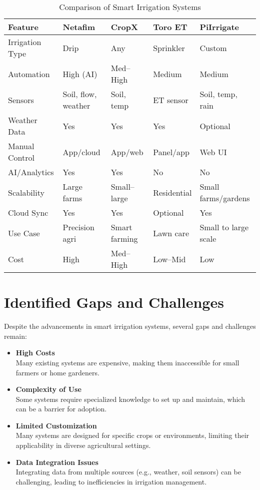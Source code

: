 \begin{table}[ht]
\centering
\begin{tabular}{|p{3.2cm}|p{3.2cm}|p{3.2cm}|p{3.2cm}|p{3.2cm}|}
\hline
\textbf{Feature} & \textbf{Netafim} & \textbf{CropX} & \textbf{Toro ET} & \textbf{PiIrrigate} \\
\hline
Irrigation Type & Drip & Any & Sprinkler & Custom \\
\hline
Automation & High (AI) & Med–High & Medium & Medium \\
\hline
Sensors & Soil, flow, weather & Soil, temp & ET sensor & Soil, temp, rain \\
\hline
Weather Data & Yes & Yes & Yes & Optional \\
\hline
Manual Control & App/cloud & App/web & Panel/app & Web UI \\
\hline
AI/Analytics & Yes & Yes & No & No \\
\hline
Scalability & Large farms & Small–large & Residential & Small farms/gardens \\
\hline
Cloud Sync & Yes & Yes & Optional & Yes \\
\hline
Use Case & Precision agri & Smart farming & Lawn care & Small to large scale\\
\hline
Cost & High & Med–High & Low–Mid & Low \\
\hline
\end{tabular}
\caption{Comparison of Smart Irrigation Systems}
\label{tab:irrigation_comparison}
\end{table}

\section{Identified Gaps and Challenges}
Despite the advancements in smart irrigation systems, several gaps and challenges remain:

\begin{itemize}
  \item \textbf{High Costs} \\
  Many existing systems are expensive, making them inaccessible for small farmers or home gardeners.
  
  \item \textbf{Complexity of Use} \\
  Some systems require specialized knowledge to set up and maintain, which can be a barrier for adoption.

  \item \textbf{Limited Customization} \\
  Many systems are designed for specific crops or environments, limiting their applicability in diverse agricultural settings.

  \item \textbf{Data Integration Issues} \\
  Integrating data from multiple sources (e.g., weather, soil sensors) can be challenging, leading to inefficiencies in irrigation management.
\end{itemize}

